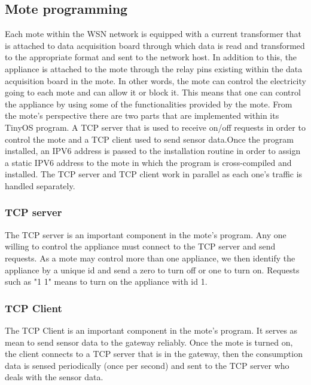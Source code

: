 \documentclass[conference]{IEEEtran}
\begin{document}
\subsection{Mote programming}
Each mote within the WSN network is equipped with a current transformer that is attached to data acquisition board through which data is read and transformed to the appropriate format and sent to the network host. In addition to this, the appliance is attached to the mote through the relay pins existing within the data acquisition board in the mote. In other words, the mote can control the electricity going to each mote and can allow it or block it. This means that one can control the appliance by using some of the functionalities provided by the mote. From the mote's perspective there are two parts that are implemented within its TinyOS program. A TCP server that is used to receive on/off requests in order to control the mote and a TCP client used to send sensor data.Once the program installed, an IPV6 address is passed to the installation routine in order to assign a static IPV6 address to the mote in which the program is cross-compiled and installed. The TCP server and TCP client work in parallel as each one's traffic is handled separately.

\subsubsection{TCP server}
The TCP server is an important component in the mote's program. Any one willing to control the appliance must connect to the TCP server and send requests. As a mote may control more than one appliance, we then identify the appliance by a unique id and send a zero to turn off or one to turn on. Requests such as "1 1" means to turn on the appliance with id 1.
\subsubsection{TCP Client}
The TCP Client is an important component in the mote's program. It serves as mean to send sensor data to the gateway reliably. Once the mote is turned on, the client connects to a TCP server that is in the gateway, then the consumption data is sensed periodically (once per second) and sent to the TCP server who deals with the sensor data.
\end{document}
